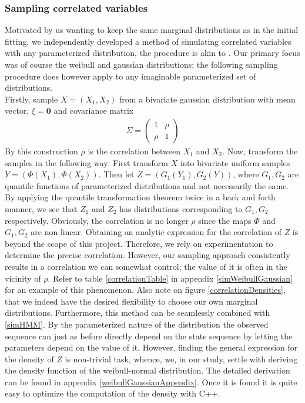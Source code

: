 \subsubsection{Sampling correlated variables}
Motivated by us wanting to keep the same marginal distributions as in the initial fitting, we independently developed a method of simulating correlated variables with any parameterized distribution, the procedure is akin to \cite{thomasWard}. Our primary focus was of course the weibull and gaussian distributions; the following sampling procedure does however apply to any imaginable parameterized set of distributions.\\ Firstly, sample $X = (X_1, X_2)$ from a bivariate gaussian distribution with mean vector, $\xi = \mathbf{0}$ and covariance matrix 
\begin{align}\Sigma = \begin{pmatrix}
    1 & \rho \\
    \rho & 1
\end{pmatrix}
\end{align}
By this construction $\rho$ is the correlation between $X_1$ and $X_2$. Now, transform the samples in the following way: First transform $X$ into bivariate uniform samples $Y = (\Phi(X_1),\Phi(X_2))$. Then let $Z = (G_1(Y_1), G_2(Y))$, where $G_1, G_2$ are quantile functions of parameterized distributions and not necessarily the same. By applying the quantile transformation theorem twice in a back and forth manner, we see that $Z_1$ and $Z_2$ has distributions corresponding to $G_1, G_2$ respectively. Obviously, the correlation is no longer $\rho$ since the maps $\Phi$ and $G_1, G_2$ are non-linear. Obtaining an analytic expression for the correlation of $Z$ is beyond the scope of this project. Therefore, we rely on experimentation to determine the precise correlation. However, our sampling approach consistently results in a correlation we can somewhat control; the value of it is often in the vicinity of $\rho$. Refer to table \ref{correlationTable} in appendix \ref{simWeibullGaussian} for an example of this phenomenon. Also note on figure \ref{correlationDensities}, that we indeed have the desired flexibility to choose our own marginal distributions. Furthermore, this method can be seamlessly combined with \ref{simHMM}. By the parameterized nature of the distribution the observed sequence can just as before directly depend on the state sequence by letting the parameters depend on the value of it. However, finding the general expression for the density of $Z$ is non-trivial task, whence, we, in our study, settle with deriving the density function of the weibull-normal distribution. The detailed derivation can be found in appendix \ref{weibullGaussianAppendix}. Once it is found it is quite easy to optimize the computation of the density with C++\cite{Rcpp}.

